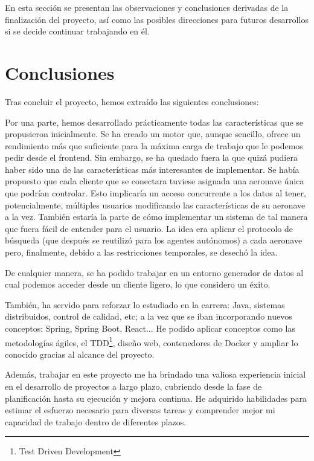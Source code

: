 
En esta sección se presentan las observaciones y conclusiones derivadas de la finalización del proyecto, así como las posibles direcciones para futuros desarrollos si se decide continuar trabajando en él.


\section{Conclusiones}
Tras concluir el proyecto, hemos extraído las siguientes conclusiones:

Por una parte, hemos desarrollado prácticamente todas las características que se propusieron inicialmente. Se ha creado un motor que, aunque sencillo, ofrece un rendimiento más que suficiente para la máxima carga de trabajo que le podemos pedir desde el frontend. Sin embargo, se ha quedado fuera la que quizá pudiera haber sido una de las características más interesantes de implementar. Se había propuesto que cada cliente que se conectara tuviese asignada una aeronave única que podrían controlar. Esto implicaría un acceso concurrente a los datos al tener, potencialmente, múltiples usuarios modificando las características de su aeronave a la vez. También estaría la parte de cómo implementar un sistema de tal manera que fuera fácil de entender para el usuario. La idea era aplicar el protocolo de búsqueda (que después se reutilizó para los agentes autónomos) a cada aeronave pero, finalmente, debido a las restricciones temporales, se desechó la idea. 

De cualquier manera, se ha podido trabajar en un entorno generador de datos al cual podemos acceder desde un cliente ligero, lo que considero un éxito. 

También, ha servido para reforzar lo estudiado en la carrera: Java, sistemas distribuidos, control de calidad, etc; a la vez que se iban incorporando nuevos conceptos: Spring, Spring Boot, React... He podido aplicar conceptos como las metodologías ágiles, el TDD\footnote{Test Driven Development}, diseño web, contenedores de Docker y ampliar lo conocido gracias al alcance del proyecto.

Además, trabajar en este proyecto me ha brindado una valiosa experiencia inicial en el desarrollo de proyectos a largo plazo, cubriendo desde la fase de planificación hasta su ejecución y mejora continua. He adquirido habilidades para estimar el esfuerzo necesario para diversas tareas y comprender mejor mi capacidad de trabajo dentro de diferentes plazos. 

